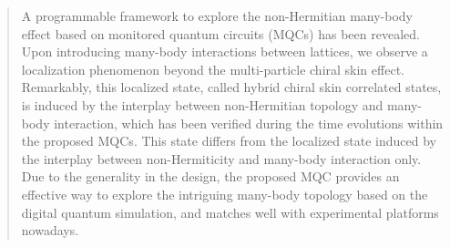 \documentclass[longbibliography, aps, prx, amsmath, amssymb, amsfonts, twocolumn,superscriptaddress, footinbib]{revtex4-1}
\begin{document}
	
	
	
	\begin{abstract}

		A programmable framework to explore the non-Hermitian many-body effect based on monitored quantum circuits (MQCs) has been revealed. Upon introducing many-body interactions between lattices, we observe a localization phenomenon beyond the multi-particle chiral skin effect. Remarkably, this localized state, called hybrid chiral skin correlated states, is induced by the interplay between non-Hermitian topology and many-body interaction, which has been verified during the time evolutions within the proposed MQCs. This state differs from the localized state induced by the interplay between non-Hermiticity and many-body interaction only. Due to the generality in the design, the proposed MQC provides an effective way to explore the intriguing many-body topology based on the digital quantum simulation, and matches well with experimental platforms nowadays. 

	\end{abstract}
	
	
	\maketitle
	
\end{document}
